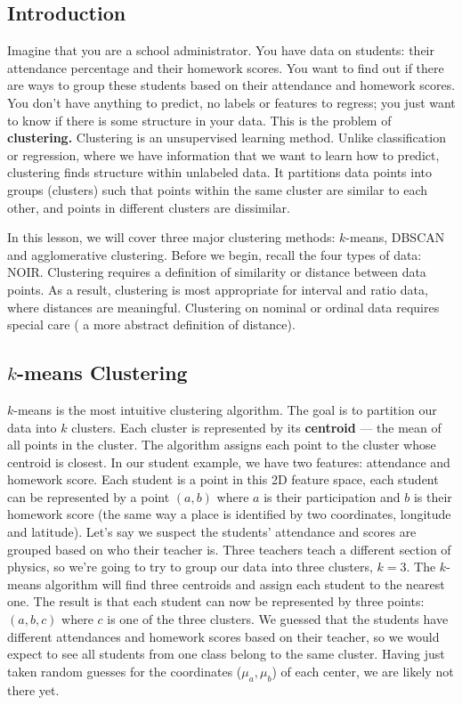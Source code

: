 \subsection*{Introduction}
Imagine that you are a school administrator. You have data on students: their attendance percentage and their homework scores. You want to find out if there are ways to group these students based on their attendance and homework scores. You don't have anything to predict, no labels or features to regress; you just want to know if there is some structure in your data. This is the problem of \textbf{clustering.} Clustering is an unsupervised learning method. Unlike classification or regression, where we have information that we want to learn how to predict, clustering finds structure within unlabeled data. It partitions data points into groups (clusters) such that points within the same cluster are similar to each other, and points in different clusters are dissimilar.

In this lesson, we will cover three major clustering methods: $k$-means, DBSCAN and agglomerative clustering. Before we begin, recall the four types of data: NOIR. Clustering requires a definition of similarity or distance between data points. As a result, clustering is most appropriate for interval and ratio data, where distances are meaningful. Clustering on nominal or ordinal data requires special care (\ie{} a more abstract definition of distance).

\subsection*{$k$-means Clustering}
$k$-means is the most intuitive clustering algorithm. The goal is to partition our data into $k$ clusters. Each cluster is represented by its \textbf{centroid} --- the mean of all points in the cluster. The algorithm assigns each point to the cluster whose centroid is closest. In our student example, we have two features: attendance and homework score. Each student is a point in this 2D feature space, \ie{} each student can be represented by a point $(a,b)$ where $a$ is their participation and $b$ is their homework score (the same way a place is identified by two coordinates, \eg{} longitude and latitude). Let's say we suspect the students' attendance and scores are grouped based on who their teacher is. Three teachers teach a different section of physics, so we're going to try to group our data into three clusters, $k=3$. The $k$-means algorithm will find three centroids and assign each student to the nearest one. The result is that each student can now be represented by three points: $(a,b,c)$ where $c$ is one of the three clusters. We guessed that the students have different attendances and homework scores based on their teacher, so we would expect to see all students from one class belong to the same cluster. Having just taken random guesses for the coordinates ($\mu_a,\mu_b$) of each center, we are likely not there yet.

